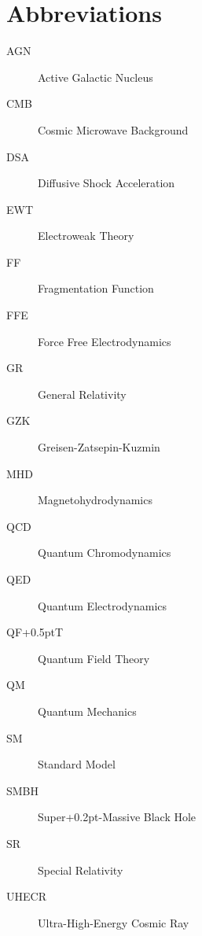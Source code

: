 \chapter*{Abbreviations}
\label{ch:abbreviations}

\begin{description}
	\item[AGN] Active Galactic Nucleus
	\item[CMB] Cosmic Microwave Background
	\item[DSA] Diffusive Shock Acceleration
	\item[EWT] Electroweak Theory
	\item[FF] Fragmentation Function
	\item[FFE] Force Free Electrodynamics
	\item[GR] General Relativity
	\item[GZK] Greisen-Zatsepin-Kuzmin
	\item[MHD] Magnetohydrodynamics
	\item[QCD] Quantum Chromodynamics
	\item[QED] Quantum Electrodynamics
	\item[QF{\kern+0.5pt}T] Quantum Field Theory
	\item[QM] Quantum Mechanics
	\item[SM] Standard Model
	\item[SMBH] Super{\kern+0.2pt}-Massive Black Hole
	\item[SR] Special Relativity
	\item[UHECR] Ultra-High-Energy Cosmic Ray
\end{description}
